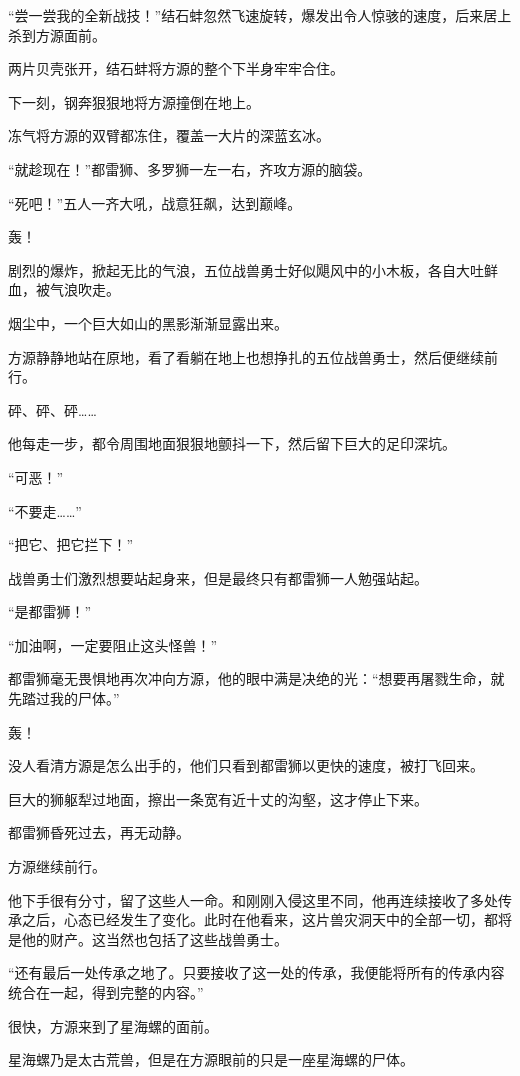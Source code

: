 \begin{this_body}
“尝一尝我的全新战技！”结石蚌忽然飞速旋转，爆发出令人惊骇的速度，后来居上杀到方源面前。

两片贝壳张开，结石蚌将方源的整个下半身牢牢合住。

下一刻，钢奔狠狠地将方源撞倒在地上。

冻气将方源的双臂都冻住，覆盖一大片的深蓝玄冰。

“就趁现在！”都雷狮、多罗狮一左一右，齐攻方源的脑袋。

“死吧！”五人一齐大吼，战意狂飙，达到巅峰。

轰！

剧烈的爆炸，掀起无比的气浪，五位战兽勇士好似飓风中的小木板，各自大吐鲜血，被气浪吹走。

烟尘中，一个巨大如山的黑影渐渐显露出来。

方源静静地站在原地，看了看躺在地上也想挣扎的五位战兽勇士，然后便继续前行。

砰、砰、砰……

他每走一步，都令周围地面狠狠地颤抖一下，然后留下巨大的足印深坑。

“可恶！”

“不要走……”

“把它、把它拦下！”

战兽勇士们激烈想要站起身来，但是最终只有都雷狮一人勉强站起。

“是都雷狮！”

“加油啊，一定要阻止这头怪兽！”

都雷狮毫无畏惧地再次冲向方源，他的眼中满是决绝的光：“想要再屠戮生命，就先踏过我的尸体。”

轰！

没人看清方源是怎么出手的，他们只看到都雷狮以更快的速度，被打飞回来。

巨大的狮躯犁过地面，擦出一条宽有近十丈的沟壑，这才停止下来。

都雷狮昏死过去，再无动静。

方源继续前行。

他下手很有分寸，留了这些人一命。和刚刚入侵这里不同，他再连续接收了多处传承之后，心态已经发生了变化。此时在他看来，这片兽灾洞天中的全部一切，都将是他的财产。这当然也包括了这些战兽勇士。

“还有最后一处传承之地了。只要接收了这一处的传承，我便能将所有的传承内容统合在一起，得到完整的内容。”

很快，方源来到了星海螺的面前。

星海螺乃是太古荒兽，但是在方源眼前的只是一座星海螺的尸体。


\end{this_body}
